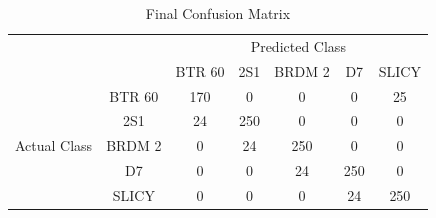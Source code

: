 \begin{table}
	\centering
	\begin{tabular}{|*{7}{c|}}
		
		\cline{3-7}
		\multicolumn{2}{c|}{}         & \multicolumn{5}{|c|}{Predicted Class} 			\\ \cline{3-7}
		\multicolumn{2}{c|}{}                  & BTR 60 & 2S1 & BRDM 2 & D7 & SLICY \\ \hline
		\multirow{5}{*}{\begin{turn}{90}Actual Class\end{turn}}
		& BTR 60 & 170    & 0   & 0      & 0  & 25	\\ \cline{2-7}
		& 2S1    & 24     & 250 & 0      & 0  & 0 	\\ \cline{2-7}
		& BRDM 2 & 0      & 24  & 250    & 0  & 0 	\\ \cline{2-7}
		& D7     & 0      & 0   & 24     & 250& 0 	\\ \cline{2-7}
		& SLICY  & 0      & 0   & 0      & 24 & 250 \\
		\hline
	\end{tabular}
	\label{tab:confusion_fin}
	\caption{Final Confusion Matrix}
	\centering
\end{table}

